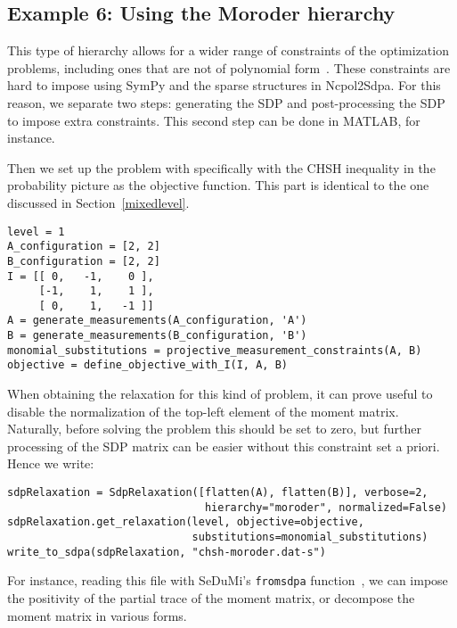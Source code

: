 \documentclass{article}
\begin{document}
\subsection{Example 6: Using the Moroder hierarchy}
This type of hierarchy allows for a wider range of constraints of the optimization problems, including ones that are not of polynomial form~\citep{moroder2013device}. These constraints are hard to impose using SymPy and the sparse structures in Ncpol2Sdpa. For this reason, we separate two steps: generating the SDP and post-processing the SDP to impose extra constraints. This second step can be done in MATLAB, for instance. 

Then we set up the problem with specifically with the CHSH inequality in the probability picture as the objective function. This part is identical to the one discussed in Section~\ref{mixedlevel}.
\begin{verbatim}
level = 1
A_configuration = [2, 2]
B_configuration = [2, 2]
I = [[ 0,   -1,    0 ],
     [-1,    1,    1 ], 
     [ 0,    1,   -1 ]]
A = generate_measurements(A_configuration, 'A')
B = generate_measurements(B_configuration, 'B')
monomial_substitutions = projective_measurement_constraints(A, B)
objective = define_objective_with_I(I, A, B)
\end{verbatim}
When obtaining the relaxation for this kind of problem, it can prove useful to disable the normalization of the top-left element of the moment matrix. Naturally, before solving the problem this should be set to zero, but further processing of the SDP matrix can be easier without this constraint set a priori. Hence we write:
\begin{verbatim}
sdpRelaxation = SdpRelaxation([flatten(A), flatten(B)], verbose=2,
                               hierarchy="moroder", normalized=False)
sdpRelaxation.get_relaxation(level, objective=objective,
                             substitutions=monomial_substitutions)
write_to_sdpa(sdpRelaxation, "chsh-moroder.dat-s")  
\end{verbatim}
For instance, reading this file with SeDuMi's \verb+fromsdpa+ function~\citep{sturm1999sedumi}, we can impose the positivity of the partial trace of the moment matrix, or decompose the moment matrix in various forms.
\end{document}

